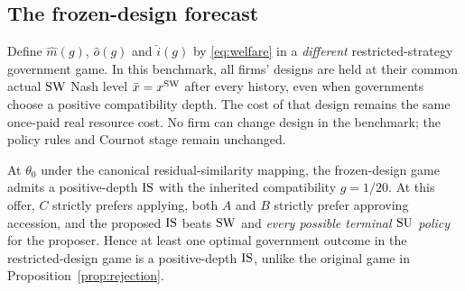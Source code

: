 \subsection{The frozen-design forecast}

Define $\widehat{m}(g)$, $\widehat{o}(g)$ and
$\widehat{i}(g)$ by \eqref{eq:welfare} in a \emph{different}
restricted-strategy government game. In this benchmark,
all firms' designs are held at their common actual $\mathrm{SW}$
Nash level $\bar x=x^{\mathrm{SW}}$ after every history, even when
governments choose a positive compatibility depth. The cost
of that design remains the same once-paid real resource cost.
No firm can change design in the benchmark; the policy rules
and Cournot stage remain unchanged.

\begin{proposition}
\label{prop:frozen}
At $\theta_0$ under the canonical residual-similarity mapping,
the frozen-design game admits a positive-depth $\mathrm{IS}$
with the inherited compatibility $g=1/20$. At this offer,
$C$ strictly prefers applying, both $A$ and $B$ strictly
prefer approving accession, and the proposed $\mathrm{IS}$
beats $\mathrm{SW}$ and \emph{every possible terminal $\mathrm{SU}$
policy} for the proposer. Hence at least one optimal
government outcome in the restricted-design game is a
positive-depth $\mathrm{IS}$, unlike the original game in
Proposition~\ref{prop:rejection}.
\end{proposition}

